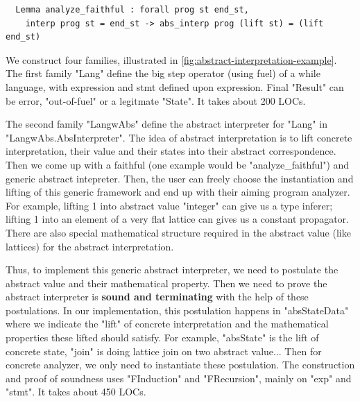 \begin{verbatim}
  Lemma analyze_faithful : forall prog st end_st, 
    interp prog st = end_st -> abs_interp prog (lift st) = (lift end_st)
\end{verbatim}
  

We construct four families, illustrated in \cref{fig:abstract-interpretation-example}.
The first family "Lang" define the big step operator (using fuel) of a
while language, with expression and stmt defined upon expression. Final "Result" can be error, "out-of-fuel" or a legitmate "State". It takes about 200 LOCs. 

The second family "LangwAbs" define the abstract interpreter for "Lang" in "LangwAbs.AbsInterpreter".
The idea of abstract interpretation is to lift concrete interpretation, their value and their states into their abstract correspondence. Then we come up with a faithful (one example would be "analyze_faithful") and generic abstract intepreter. Then, the user can freely choose the instantiation and lifting of this generic framework and end up with their aiming program analyzer. For example, lifting 1 into abstract value "integer" can give us a type inferer; lifting 1 into an element of a very flat lattice can gives us a constant propagator. There are also special mathematical structure required in the abstract value (like lattices) for the abstract interpretation. 

Thus, to implement this generic abstract interpreter, we need to postulate the abstract value and their mathematical property. Then we need to prove the abstract interpreter is \textbf{sound and terminating}  with the help of these postulations. In our implementation, this postulation happens in "absStateData" where we indicate the "lift" of concrete interpretation and the mathematical properties these lifted should satisfy. For example, "absState" is the lift of concrete state, "join" is doing lattice join on two abstract value... Then for concrete analyzer, we only need to instantiate these postulation. The construction and proof of soundness uses "FInduction" and "FRecursion", mainly on "exp" and "stmt". 
It takes about 450 LOCs. 


